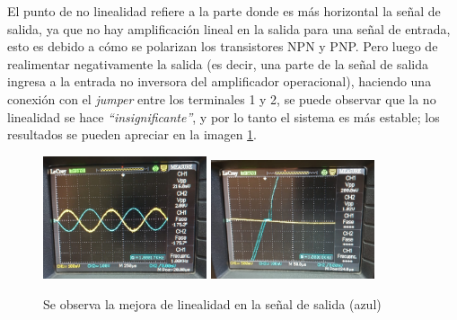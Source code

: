 \documentclass[letterpaper, 10 pt, conference]{ieeeconf}  %
\begin{document}
 El punto de no linealidad refiere a la parte donde es más horizontal la señal de salida, ya que no hay amplificación lineal en la salida para una señal de entrada, esto es debido a cómo se polarizan los transistores NPN y PNP. Pero luego de realimentar negativamente la salida (es decir, una parte de la señal de salida ingresa a la entrada no inversora del amplificador operacional), haciendo una conexión con el \textit{jumper} entre los terminales 1 y 2, se puede observar que la no linealidad se hace \textit{``insignificante''}, y por lo tanto el sistema es más estable; los resultados se pueden apreciar en la imagen \ref{imagen:linealidad}.

\begin{figure}[H]
   \centering
   \includegraphics[width=0.43\textwidth]{./linealidad2.jpeg}
   \includegraphics[width=0.43\textwidth]{./linealidad.jpeg}
   \caption{Se observa la mejora de linealidad en la señal de salida (azul)}
   \label{imagen:linealidad}
 \end{figure}


%
\end{document}
